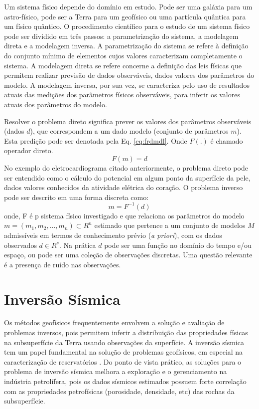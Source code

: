 Um sistema físico depende do domínio em estudo. Pode ser uma galáxia para um
astro-físico, pode ser a Terra para um geofísico ou uma partícula quântica
para um físico quântico. O procedimento científico para o estudo de um sistema
físico pode ser dividido em três passos: a parametrização do sistema, a modelagem direta e a modelagem inversa.
A parametrização do sistema se refere à definição do conjunto mínimo de elementos cujos
valores caracterizam completamente o sistema. A modelagem direta se refere concerne a
definição das leis físicas que permitem realizar previsão de dados observáveis, dados
valores dos parâmetros do modelo. A modelagem inversa, por sua vez, se caracteriza pelo
uso de resultados atuais das medições dos parâmetros físicos observáveis, para inferir os valores atuais dos
parâmetros do modelo.

Resolver o problema direto significa prever os valores dos parâmetros observáveis (dados $d$),
que correspondem a um dado modelo (conjunto de parâmetros $m$). Esta predição pode ser denotada
pela Eq. \ref{eq:frdmdl}. Onde $F(.)$ é chamado operador direto.
\begin{equation}
\label{eq:frdmdl}
F(m) = d 
\end{equation}
No exemplo do eletrocardiograma citado anteriormente, o problema direto pode
ser entendido como o cálculo do potencial em algum ponto da superfície da pele,
dados valores conhecidos da atividade elétrica do coração.
O problema inverso pode ser descrito em uma forma discreta como:
\begin{equation}
\label{eq:deqgm}
m = F^{-1}(d)
\end{equation}
onde, F é p sistema físico investigado e que relaciona os parâmetros do modelo $m=(m_1, m_2,...,m_n) \subset R^n$
estimado que pertence a um conjunto de modelos $M$ admissíveis
em termos de conhecimento prévio (\textit{a priori}), com os dados observados $d \in R^s$.
Na prática $d$ pode ser uma função no domínio do tempo e/ou espaço, ou pode ser
uma coleção de observações discretas. Uma questão relevante é a presença de
ruído nas observações.

\section{Inversão Sísmica}

Os métodos geofísicos frequentemente envolvem a solução e avaliação de problemas inversos,
pois permitem inferir a distribuição das propriedades físicas na subsuperfície da Terra
usando observações da superfície. A inversão sísmica tem um papel fundamental na solução 
de problemas geofísicos, em especial na caracterização de reservatórios \cite{Bosch2010} \cite{Srivastava2009}.
Do ponto de vista prático, as soluções para o problema de inversão sísmica melhora a exploração e
o gerenciamento na indústria petrolífera, pois os dados sísmicos estimados possuem forte correlação com as
propriedades petrofísicas (porosidade, densidade, etc) das rochas da subsuperfície\cite{Figueiredo2014}.

